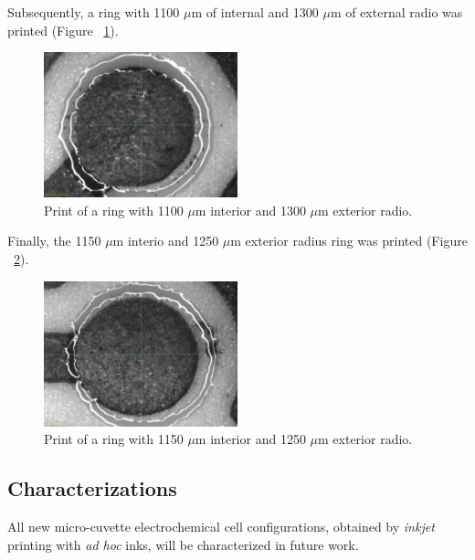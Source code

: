 Subsequently, a ring with 1100 $\mu$m of internal and 1300 $\mu$m of external radio was printed (Figure ~\ref{fig:Figura_Anillo110a130_SU8}).

\begin{figure}[H]
  \centering
    \includegraphics[width=0.5\textwidth]{Figures/Figura_Anillo110a130_SU8}
  \caption{Print of a ring with 1100 $\mu$m interior and 1300 $\mu$m exterior radio.}
  \label{fig:Figura_Anillo110a130_SU8}
\end{figure}

Finally, the 1150 $\mu$m interio and 1250 $\mu$m exterior radius ring was printed (Figure ~\ref{fig:Figura_Anillo115a125_SU8}).

\begin{figure}[H]
  \centering
    \includegraphics[width=0.5\textwidth]{Figures/Figura_Anillo115a125_SU8}
  \caption{Print of a ring with 1150 $\mu$m interior and 1250 $\mu$m exterior radio.}
  \label{fig:Figura_Anillo115a125_SU8}
\end{figure}

\subsection{Characterizations}
All new micro-cuvette electrochemical cell configurations, obtained by \textit{inkjet} printing with \textit{ad hoc} inks, will be characterized in future work.